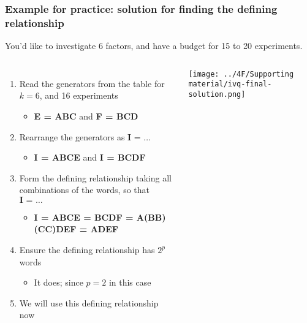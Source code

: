 \begin{frame}\frametitle{Example for practice: {\color{myOrange}solution} for finding the defining relationship}
	
	\vspace{0.5cm}
	You'd like to investigate 6 factors, and have a budget for 15 to 20 experiments.
	
	\vspace{0.5cm}
	\begin{columns}[T]
			\begin{enumerate}
				\item	Read the generators from the table for $k=6$, and 16 experiments
					\begin{itemize}
						\item	\textbf{E = ABC}	and  \textbf{F = BCD}
					\end{itemize}
				\item	Rearrange the generators as  $\textbf{I = \ldots}$
					\begin{itemize}
						\item	\textbf{I = ABCE}	and  \textbf{I = BCDF}
					\end{itemize}
			 	\item	Form the {\color{purple}defining relationship} taking all combinations of the words, so that $\textbf{I = \ldots}$
					\begin{itemize}
						\item	\textbf{I = ABCE = BCDF = A(BB)(CC)DEF = ADEF}
					\end{itemize}
			 	\item	Ensure the defining relationship has $2^p$ words
					\begin{itemize}
						\item	It does; since $p=2$ in this case
					\end{itemize} 
				\item	We will use this defining relationship now
			\end{enumerate}
			
			\centerline{\texttt{[image: ../4F/Supporting material/ivq-final-solution.png]}}

	\end{columns}

	
\end{frame}

